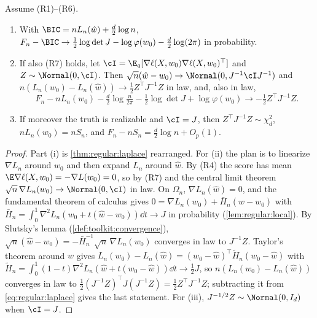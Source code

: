 \begin{refsection}
\begin{corollary}\label{cor:regular:bic}
Assume (R1)--(R6).
\begin{enumerate}
\item With $\BIC=nL_n(\hat w)+\frac d2\log n$, $F_n-\BIC\to\frac12\log\det J-\log\varphi(w_0)-\frac d2\log(2\pi)$ in probability.
\item If also (R7) holds, let $\cI=\E_q[\nabla\ell(X,w_0)\nabla\ell(X,w_0)^\top]$ and $Z\sim\Normal(0,\cI)$. Then $\sqrt n(\hat w-w_0)\to\Normal(0,J^{-1}\cI J^{-1})$ and $n(L_n(w_0)-L_n(\hat w))\to\frac12Z^\top J^{-1}Z$ in law, and, also in law,
\[
F_n-nL_n(w_0)-\tfrac d2\log\tfrac n{2\pi}-\tfrac12\log\det J+\log\varphi(w_0)\to-\tfrac12Z^\top J^{-1}Z.
\]
\item If moreover the truth is realizable and $\cI=J$, then $Z^\top J^{-1}Z\sim\chi^2_d$, $nL_n(w_0)=nS_n$, and $F_n-nS_n=\frac d2\log n+O_p(1)$.
\end{enumerate}
\end{corollary}

\begin{proof}
Part (i) is \cref{thm:regular:laplace} rearranged. For (ii) the plan is to linearize $\nabla L_n$ around $w_0$ and then expand $L_n$ around $\hat w$. By (R4) the score has mean $\E\nabla\ell(X,w_0)=-\nabla L(w_0)=0$, so by (R7) and the central limit theorem $\sqrt n\,\nabla L_n(w_0)\to\Normal(0,\cI)$ in law. On $\Omega_n$, $\nabla L_n(\hat w)=0$, and the fundamental theorem of calculus gives $0=\nabla L_n(w_0)+\bar H_n(\hat w-w_0)$ with $\bar H_n=\int_0^1\nabla^2L_n(w_0+t(\hat w-w_0))\dd t\to J$ in probability (\cref{lem:regular:local}). By Slutsky's lemma (\cref{def:toolkit:convergence}), $\sqrt n(\hat w-w_0)=-\bar H_n^{-1}\sqrt n\,\nabla L_n(w_0)$ converges in law to $J^{-1}Z$. Taylor's theorem around $\hat w$ gives $L_n(w_0)-L_n(\hat w)=(w_0-\hat w)^\top\tilde H_n(w_0-\hat w)$ with $\tilde H_n=\int_0^1(1-t)\nabla^2L_n(\hat w+t(w_0-\hat w))\dd t\to\frac12J$, so $n(L_n(w_0)-L_n(\hat w))$ converges in law to $\frac12(J^{-1}Z)^\top J(J^{-1}Z)=\frac12Z^\top J^{-1}Z$; subtracting it from \eqref{eq:regular:laplace} gives the last statement. For (iii), $J^{-1/2}Z\sim\Normal(0,I_d)$ when $\cI=J$.
\end{proof}


\end{refsection}
